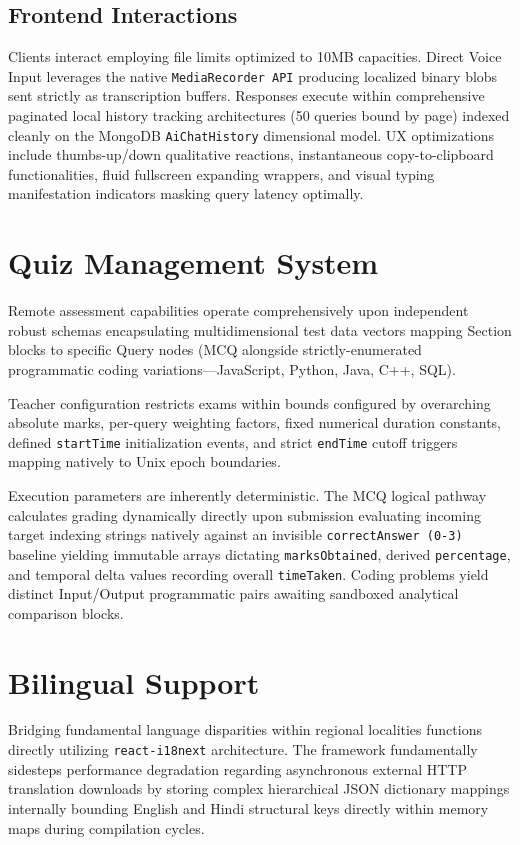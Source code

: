 \documentclass[12pt, journal, onecolumn]{IEEEtran}
\begin{document}
\subsection{Frontend Interactions}
Clients interact employing file limits optimized to 10MB capacities. Direct Voice Input leverages the native \texttt{MediaRecorder API} producing localized binary blobs sent strictly as transcription buffers. Responses execute within comprehensive paginated local history tracking architectures (50 queries bound by page) indexed cleanly on the MongoDB \texttt{AiChatHistory} dimensional model. UX optimizations include thumbs-up/down qualitative reactions, instantaneous copy-to-clipboard functionalities, fluid fullscreen expanding wrappers, and visual typing manifestation indicators masking query latency optimally.

\section{Quiz Management System}
Remote assessment capabilities operate comprehensively upon independent robust schemas encapsulating multidimensional test data vectors mapping Section blocks to specific Query nodes (MCQ alongside strictly-enumerated programmatic coding variations—JavaScript, Python, Java, C++, SQL).

Teacher configuration restricts exams within bounds configured by overarching absolute marks, per-query weighting factors, fixed numerical duration constants, defined \texttt{startTime} initialization events, and strict \texttt{endTime} cutoff triggers mapping natively to Unix epoch boundaries.

Execution parameters are inherently deterministic. The MCQ logical pathway calculates grading dynamically directly upon submission evaluating incoming target indexing strings natively against an invisible \texttt{correctAnswer (0-3)} baseline yielding immutable arrays dictating \texttt{marksObtained}, derived \texttt{percentage}, and temporal delta values recording overall \texttt{timeTaken}. Coding problems yield distinct Input/Output programmatic pairs awaiting sandboxed analytical comparison blocks.

\section{Bilingual Support}
Bridging fundamental language disparities within regional localities functions directly utilizing \texttt{react-i18next} architecture. The framework fundamentally sidesteps performance degradation regarding asynchronous external HTTP translation downloads by storing complex hierarchical JSON dictionary mappings internally bounding English and Hindi structural keys directly within memory maps during compilation cycles.
\end{document}
